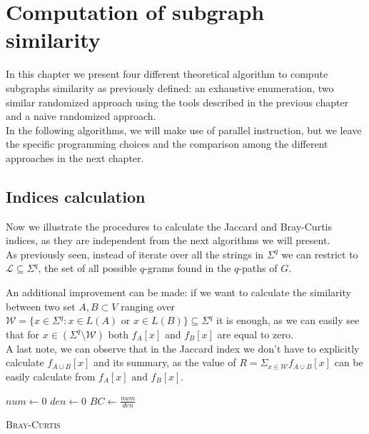 \chapter{Computation of subgraph similarity}

	In this chapter we present four different theoretical algorithm to compute subgraphs similarity as previously defined: an exhaustive enumeration, two similar randomized approach using the tools described in the previous chapter and a naive randomized approach.\\
	
	In the following algorithms, we will make use of parallel instruction, but we leave the specific programming choices and the comparison among the different approaches in the next chapter.
	
\section{Indices calculation}

Now we illustrate the procedures to calculate the Jaccard and Bray-Curtis indices, as they are independent from the next algorithms we will present.\\

As previously seen, instead of iterate over all the strings in $\Sigma^{q}$ we can restrict to $\mathcal{L} \subseteq \Sigma^{q}$, the set of all possible $q$-grams found in the $q$-paths of $G$. 

An additional improvement can be made: if we want to calculate the similarity between two set $A, B \subset V$ ranging over $\mathcal{W} = \{ x \in \Sigma^{q} : x \in L(A) \text{ or } x \in L(B) \} \subseteq \Sigma^{q}$ it is enough, as we can easily see that for $x \in ( \Sigma^{q} \setminus \mathcal{W} )$ both $f_A[x]$ and $f_B[x]$ are equal to zero.\\

A last note, we can observe that in the Jaccard index we don't have to explicitly calculate $f_{A \cup B}[x]$ and its summary, as the value of $R = \Sigma_{x \in \mathcal{W}} f_{A \cup B}[x]$ can be easily calculate from $f_{A}[x] \text{ and } f_{B}[x]$.\\

\begin{algorithm}[h]
	\small
	\DontPrintSemicolon
	\BlankLine
	$num \gets 0$\;
	$den \gets 0$\;
	$BC \gets \frac{num}{den}$\;
	\caption{\textsc{Bray-Curtis}}
	\label{alg:bray-curtis}
\end{algorithm}

